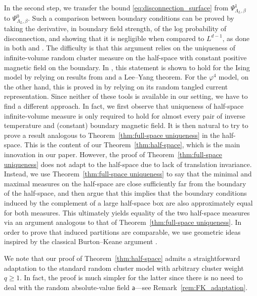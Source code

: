 \documentclass[11pt,a4paper]{article}
\numberwithin{equation}{section}
\theoremstyle{plain}
\theoremstyle{definition}
\begin{document}
In the second step, we transfer the bound \eqref{eq:disconnection_surface} from $\Psi^1_{\Lambda_L,\beta}$ to $\Psi^0_{\Lambda_L,\beta}$. Such a comparison between boundary conditions can be proved by taking the derivative, in boundary field strength, of the log probability of disconnection, and showing that it is negligible when compared to $L^{d-1}$, as done in both \cite{Bod05} and \cite{gunaratnam2025supercritical}.  The difficulty is that this argument relies on the uniqueness of infinite-volume random cluster measure on the half-space with constant positive magnetic field on the boundary. In \cite{Bod05}, this statement is shown to hold for the Ising model by relying on results from \cite{frohlich1987semi} and a Lee--Yang theorem. For the $\varphi^4$ model, on the other hand, this is proved in \cite{gunaratnam2025supercritical} by relying on its random tangled current representation. 
Since neither of these tools is available in our setting, we have to find a different approach. In fact, we first observe that uniqueness of half-space infinite-volume measure is only required to hold for almost every pair of inverse temperature and (constant) boundary magnetic  field.   It is then natural to try to prove a result analogous to Theorem~\ref{thm:full-space uniqueness} in the half-space. This is the content of our Theorem~\ref{thm:half-space}, which is the main innovation in our paper. However, the proof of Theorem~\ref{thm:full-space uniqueness} does not adapt to the half-space due to lack of translation invariance. Instead, we use  Theorem~\ref{thm:full-space uniqueness} to say that the minimal and maximal measures on the half-space are close sufficiently far from the boundary of the half-space, and then argue that this implies that the boundary conditions induced by the complement of a large half-space box are also approximately equal for both measures. This ultimately yields equality of the two half-space measures via an argument analogous to that of Theorem~\ref{thm:full-space uniqueness}. In order to prove that induced partitions are comparable, we use geometric ideas inspired by the classical Burton--Keane argument \cite{BurtonKeane1989density}. 

We note that our proof of Theorem~\ref{thm:half-space} admits a straightforward adaptation to the standard random cluster model with arbitrary cluster weight $q\geq1$. In fact, the proof is much simpler for the latter since there is no need to deal with the random absolute-value field $\mathsf{a}$---see Remark~\ref{rem:FK_adaptation}. 
\end{document}
